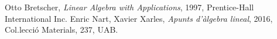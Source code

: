 \documentclass[a4paper,12pt,twoside]{article}
\newcommand{\1}{\mathbf{1}}
\newcommand{\0}{\mathbf{0}}
\theoremstyle{definition}
\theoremstyle{remark}
\begin{document}

\printindex
\begin{thebibliography}{20}
	Otto Bretscher,
	\textit{Linear Algebra with Applications},
	1997, Prentice-Hall International Inc.
	Enric Nart, Xavier Xarles,
	\textit{Apunts d'àlgebra lineal}, 2016, Col.lecci\'o Materials, 237, UAB.
\end{thebibliography}
\end{document}
